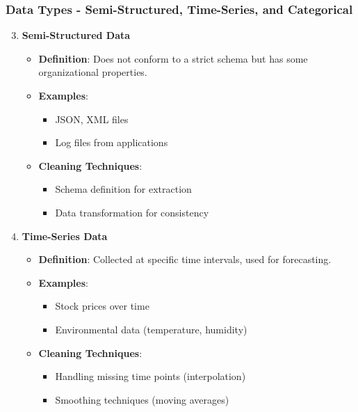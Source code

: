 \documentclass[aspectratio=169]{beamer}
\begin{document}
\begin{frame}[fragile]
    \frametitle{Data Types - Semi-Structured, Time-Series, and Categorical}
    \begin{enumerate}
        \setcounter{enumi}{2}
        \item \textbf{Semi-Structured Data}
            \begin{itemize}
                \item \textbf{Definition}: Does not conform to a strict schema but has some organizational properties.
                \item \textbf{Examples}:
                    \begin{itemize}
                        \item JSON, XML files
                        \item Log files from applications
                    \end{itemize}
                \item \textbf{Cleaning Techniques}:
                    \begin{itemize}
                        \item Schema definition for extraction
                        \item Data transformation for consistency
                    \end{itemize}
            \end{itemize}

        \item \textbf{Time-Series Data}
            \begin{itemize}
                \item \textbf{Definition}: Collected at specific time intervals, used for forecasting.
                \item \textbf{Examples}:
                    \begin{itemize}
                        \item Stock prices over time
                        \item Environmental data (temperature, humidity)
                    \end{itemize}
                \item \textbf{Cleaning Techniques}:
                    \begin{itemize}
                        \item Handling missing time points (interpolation)
                        \item Smoothing techniques (moving averages)
                    \end{itemize}
            \end{itemize}


\end{enumerate}
\end{frame}
\end{document}

